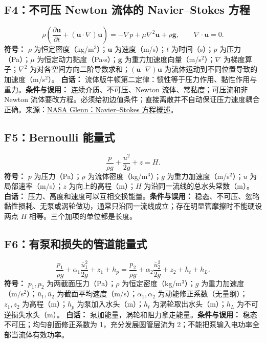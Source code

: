 \subsection{F4：不可压 Newton 流体的 Navier--Stokes 方程}
\begin{equation}
\rho\left(\frac{\partial\mathbf u}{\partial t}+(\mathbf u\cdot\nabla)\mathbf u\right)=-\nabla p+\mu\nabla^2\mathbf u+\rho\mathbf g,\qquad \nabla\cdot\mathbf u=0.
\end{equation}
\textbf{符号：} $\rho$ 为恒定密度（kg/m$^3$）；$\mathbf u$ 为速度（m/s）；$t$ 为时间（s）；$p$ 为压力（Pa）；$\mu$ 为恒定动力黏度（Pa$\cdot$s）；$\mathbf g$ 为重力加速度向量（m/s$^2$）；$\nabla$ 为梯度算子；$\nabla^2$ 为对各空间方向二阶导数求和；$(\mathbf u\cdot\nabla)\mathbf u$ 为流体运动到不同位置导致的加速度（m/s$^2$）。
\textbf{白话：} 流体版牛顿第二定律：惯性等于压力作用、黏性作用与重力。\textbf{条件与误用：} 连续介质、不可压、Newton 流体、常黏度；可压流和非 Newton 流体要改方程。必须给初边值条件；直接离散并不自动保证压力速度耦合正确。来源：\href{https://www.grc.nasa.gov/www/k-12/airplane/nseqs.html}{NASA Glenn：Navier--Stokes 方程概述}。

\subsection{F5：Bernoulli 能量式}
\begin{equation}
\frac p{\rho g}+\frac{u^2}{2g}+z=H.
\end{equation}
\textbf{符号：} $p$ 为压力（Pa）；$\rho$ 为流体密度（kg/m$^3$）；$g$ 为重力加速度（m/s$^2$）；$u$ 为局部速率（m/s）；$z$ 为向上的高程（m）；$H$ 为沿同一流线的总水头常数（m）。
\textbf{白话：} 压力、高度和速度可以互相交换能量。\textbf{条件与误用：} 稳态、不可压、忽略黏性损耗、无泵或涡轮做功，通常只沿同一流线成立；存在明显管摩擦时不能硬设两点 $H$ 相等。三个加项的单位都是长度。

\subsection{F6：有泵和损失的管道能量式}
\begin{equation}
\frac{p_1}{\rho g}+\alpha_1\frac{\bar u_1^2}{2g}+z_1+h_p=\frac{p_2}{\rho g}+\alpha_2\frac{\bar u_2^2}{2g}+z_2+h_t+h_L.
\end{equation}
\textbf{符号：} $p_1,p_2$ 为两截面压力（Pa）；$\rho$ 为恒定密度（kg/m$^3$）；$g$ 为重力加速度（m/s$^2$）；$\bar u_1,\bar u_2$ 为截面平均速度（m/s）；$\alpha_1,\alpha_2$ 为动能修正系数（无量纲）；$z_1,z_2$ 为高程（m）；$h_p$ 为泵加入水头（m）；$h_t$ 为涡轮取出水头（m）；$h_L$ 为不可逆损失水头（m）。
\textbf{白话：} 泵加能量，涡轮和阻力拿走能量。\textbf{条件与误用：} 稳态不可压；均匀剖面修正系数为 1，充分发展圆管层流为 2；不能把泵输入电功率全部当流体有效功率。

